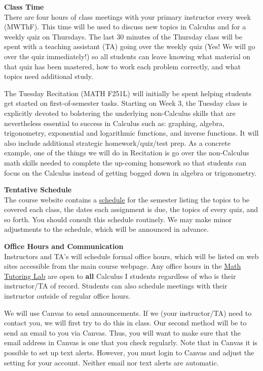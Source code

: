 \documentclass[12pt]{article}
\renewcommand{\emph}[1]{\textsf{\textbf{#1}}}
\newcommand{\localhead}[1]{\par\smallskip\textbf{#1}\nobreak\\}%
\def\heading#1{\localhead{\large\emph{#1}}}
\begin{document}
\heading{Class Time}
There are four hours of class meetings with your primary instructor every week (MWThF). This time will be used to discuss new topics in Calculus and for a weekly quiz on Thursdays. The last 30 minutes of the Thursday class will be spent with a teaching assistant (TA) going over the weekly quiz (Yes! We will go over the quiz immediately!) so all students can leave knowing what material on that quiz has been mastered, how to work each problem correctly,  and what topics need additional study. 

The Tuesday Recitation (MATH F251L) will initially be spent helping students get started on first-of-semester tasks. Starting on Week 3, the Tuesday class is explicitly devoted to bolstering the underlying non-Calculus skills that are nevertheless essential to success in Calculus such as: graphing, algebra, trigonometry, exponential and logarithmic functions, and inverse functions. It will also include additional strategic homework/quiz/test prep. As a concrete example, one of the things we will do in Recitation is go over the non-Calculus math skills needed to complete the up-coming homework so that students can focus on the Calculus instead of getting bogged down in algebra or trigonometry.

\heading{Tentative Schedule}
The course website contains a \href{https://uaf-math251.github.io/assets/general/Spring2021/MATH251-Schedule.pdf}{schedule} for the semester listing
the topics to be covered each class, the dates each assignment is due,
the topics of every quiz, and so forth. You should consult this schedule
routinely.  We may make minor adjustments to the schedule, which
will be announced in advance.

\heading{Office Hours and Communication}
Instructors and TA's will schedule formal office hours,
which will be listed on web sites accessible from the main
course webpage. Any office hours in the \href{https://uaf.edu/dms/mathlab/}{Math Tutoring Lab} are open to \emph{all} Calculus I students regardless of who is their instructor/TA of record. Students can also schedule meetings with their instructor outside of regular office hours. 

We will use Canvas to send announcements. If we (your instructor/TA) need to contact you, we will first try to do this in class. Our second method will be to send an email to you via Canvas. Thus, you will want to make sure that the email address in Canvas is one that you check regularly. Note that in Canvas it is possible to set up text alerts. However, you must login to Canvas and adjust the setting for your account. Neither email nor text alerts are automatic.
\end{document}
